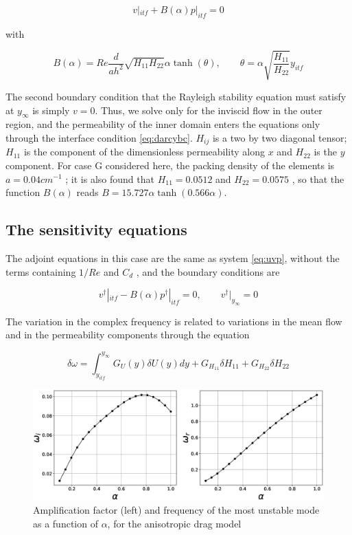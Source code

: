 \begin{equation}
v|_{itf} + B(\alpha) p|_{itf} = 0
\label{eq:darcybc}
\end{equation}

with

$$
B(\alpha) = Re \dfrac{d}{ah^2} \sqrt{{H}_{11} {H}_{22}} \alpha \tanh (\theta), \qquad \theta = \alpha \sqrt{\dfrac{{H}_{11}}{{H}_{22}}}  y_{itf}
$$

The second boundary condition that the Rayleigh stability equation must satisfy at $y_{\infty}$ is simply $v = 0$. Thus, we solve only for the inviscid flow in the outer region, and the permeability
of the inner domain enters the equations only through the interface condition \ref{eq:darcybc}. ${H}_{ij}$ is a two by two diagonal tensor; ${H}_{11}$ is the component of the dimensionless permeability along $x$ and
${H}_{22}$ is the $y$ component. For case G considered here, the packing density of the elements is
$a = 0.04 cm^{-1}$ ; it is also found that ${H}_{11}= 0.0512$ and ${H}_{22} = 0.0575$ \citet{zampognaprivate},  so that the function $B(\alpha)$
reads $B = 15.727 \alpha \tanh (0.566 \alpha)$.


\subsection{The sensitivity equations}

The adjoint equations in this case are the same as system \ref{eq:uvp}, without the terms containing $1/Re$
and $C_d$ , and the boundary conditions are

\begin{equation}
v^{\dagger}|_{itf} - B(\alpha) p^{\dagger}|_{itf} = 0, \qquad v^{\dagger}|_{y_{\infty}} = 0
\label{eq:darcybc_adjoint}
\end{equation}

The variation in the complex frequency is related to variations in the mean flow and in the permeability components through the equation

$$
\delta \omega = \int_{y_{itf}}^{y_{\infty}}  G_U(y) \delta U(y) dy + G_{{H}_{11}} \delta {H}_{11} + G_{{H}_{22}} \delta {H}_{22}
$$

\begin{figure}[H]
	\centering
	\includegraphics[width=1\linewidth]{chapter_3/figure/6}
	\caption{Amplification factor (left) and frequency of the most unstable mode as a function of $\alpha$, for the anisotropic drag
		model}
	\label{fig:6}
\end{figure}


